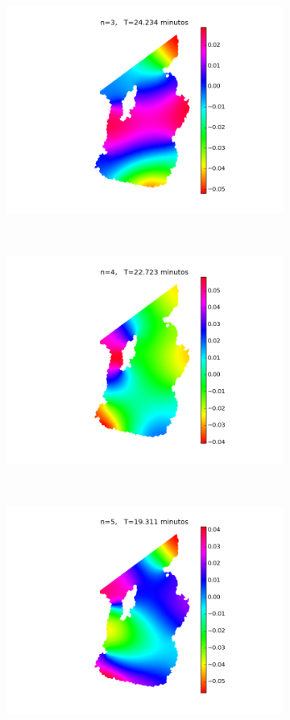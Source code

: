 \begin{figure}
\begin{subfigure}{0.5\textwidth}
    \includegraphics[width=\textwidth]{figuras/modos3.png}
  \end{subfigure}
  ~
  \begin{subfigure}{0.5\textwidth}
    \includegraphics[width=\textwidth]{figuras/modos4.png}
  \end{subfigure}
  \\
  \begin{subfigure}{0.5\textwidth}
    \includegraphics[width=\textwidth]{figuras/modos5.png}

\end{subfigure}
\end{figure}
